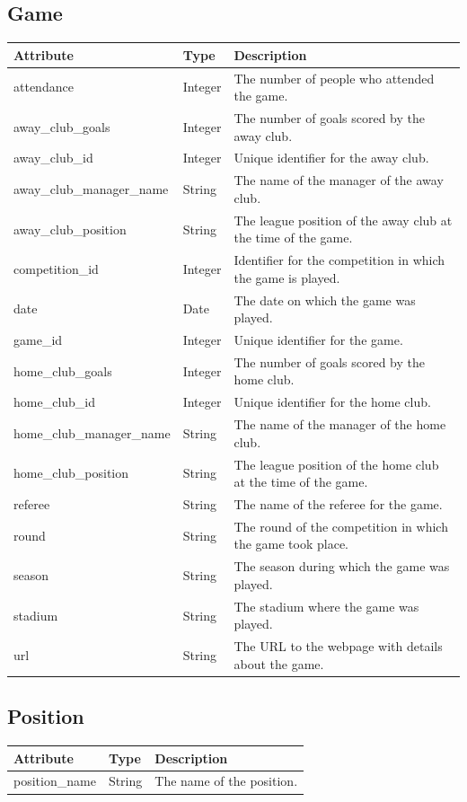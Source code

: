 \documentclass{Configuration_Files/PoliMi3i_thesis}
\begin{document}
\subsection*{Game}
\begin{longtable}{|p{5cm}|p{2cm}|p{8cm}|}
\hline
\textbf{Attribute} & \textbf{Type} & \textbf{Description} \\
\hline
\endhead
attendance & Integer & The number of people who attended the game. \\
away\_club\_goals & Integer & The number of goals scored by the away club. \\
away\_club\_id & Integer & Unique identifier for the away club. \\
away\_club\_manager\_name & String & The name of the manager of the away club. \\
away\_club\_position & String & The league position of the away club at the time of the game. \\
competition\_id & Integer & Identifier for the competition in which the game is played. \\
date & Date & The date on which the game was played. \\
game\_id & Integer & Unique identifier for the game. \\
home\_club\_goals & Integer & The number of goals scored by the home club. \\
home\_club\_id & Integer & Unique identifier for the home club. \\
home\_club\_manager\_name & String & The name of the manager of the home club. \\
home\_club\_position & String & The league position of the home club at the time of the game. \\
referee & String & The name of the referee for the game. \\
round & String & The round of the competition in which the game took place. \\
season & String & The season during which the game was played. \\
stadium & String & The stadium where the game was played. \\
url & String & The URL to the webpage with details about the game. \\
\hline
\end{longtable}


\subsection*{Position}
\begin{longtable}{|p{4cm}|p{3cm}|p{8cm}|}
\hline
\textbf{Attribute} & \textbf{Type} & \textbf{Description} \\
\hline
\endhead
position\_name & String & The name of the position. \\
\hline
\end{longtable}
\end{document}
